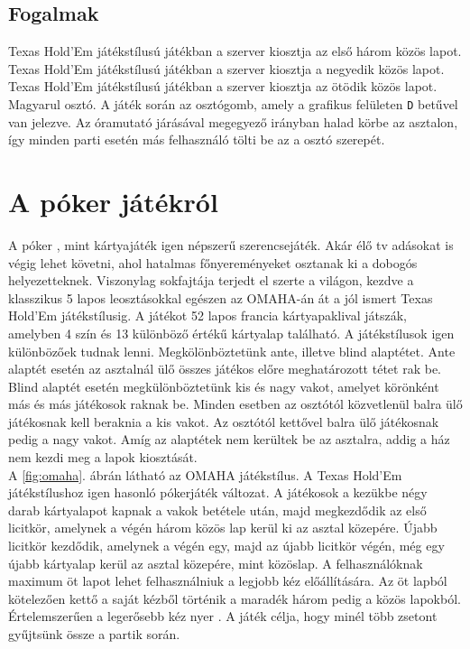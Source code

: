 \subsection{Fogalmak}
Texas Hold'Em játékstílusú játékban a szerver kiosztja az első három közös lapot.
Texas Hold'Em játékstílusú játékban a szerver kiosztja a negyedik közös lapot.
Texas Hold'Em játékstílusú játékban a szerver kiosztja az ötödik közös lapot.
Magyarul osztó. A játék során az osztógomb, amely a grafikus felületen \texttt{D} betűvel van jelezve. Az óramutató járásával megegyező irányban halad körbe az asztalon, így minden parti esetén más felhasználó tölti be az a osztó szerepét.

\section{A póker játékról}
A póker \cite{poker_game}, mint kártyajáték igen népszerű szerencsejáték. Akár élő tv adásokat is végig lehet követni, ahol hatalmas főnyereményeket osztanak ki a dobogós helyezetteknek. Viszonylag sokfajtája terjedt el szerte a világon, kezdve a klasszikus 5 lapos leosztásokkal egészen az OMAHA-án át a jól ismert Texas Hold'Em játékstílusig. A játékot 52 lapos francia kártyapaklival játszák, amelyben 4 szín és 13 különböző értékű kártyalap található. A játékstílusok igen különbözőek tudnak lenni. Megkölönböztetünk ante, illetve blind alaptétet. Ante alaptét esetén az asztalnál ülő összes játékos előre meghatározott tétet rak be. Blind alaptét esetén megkülönböztetünk kis és nagy vakot, amelyet körönként más és más játékosok raknak be. Minden esetben az osztótól közvetlenül balra ülő játékosnak kell beraknia a kis vakot. Az osztótól kettővel balra ülő játékosnak pedig a nagy vakot. Amíg az alaptétek nem kerültek be az asztalra, addig a ház nem kezdi meg a lapok kiosztását. \\
A \ref{fig:omaha}. ábrán látható az OMAHA \cite{omaha_poker} játékstílus. A Texas Hold'Em játékstílushoz igen hasonló pókerjáték változat. A játékosok a kezükbe négy darab kártyalapot kapnak a vakok betétele után, majd megkezdődik az első licitkör, amelynek a végén három közös lap kerül ki az asztal közepére. Újabb licitkör kezdődik, amelynek a végén egy, majd az újabb licitkör végén, még egy újabb kártyalap kerül az asztal közepére, mint közöslap. A felhasználóknak maximum öt lapot lehet felhasználniuk a legjobb kéz előállítására. Az öt lapból kötelezően kettő a saját kézből történik a maradék három pedig a közös lapokból. Értelemszerűen a legerősebb kéz nyer \cite{card_combinations}. A játék célja, hogy minél több zsetont gyűjtsünk össze a partik során.
